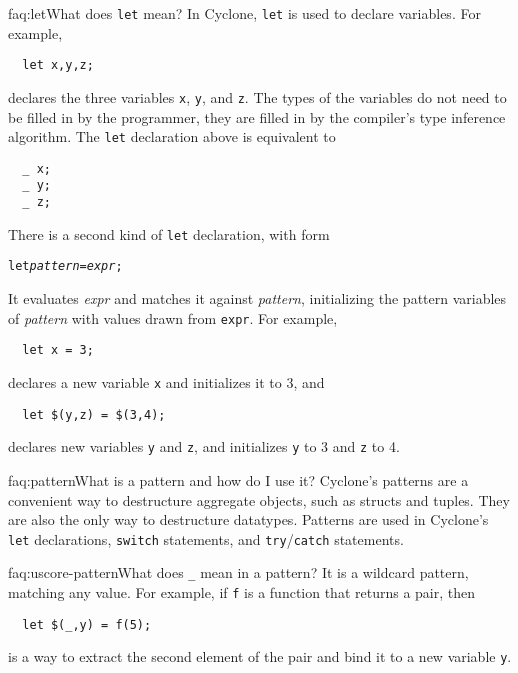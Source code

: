 \begin{faqa}{faq:let}{What does \texttt{let} mean?}
In Cyclone, \texttt{let} is used to declare variables.  For example,
\begin{verbatim}
  let x,y,z;
\end{verbatim}
declares the three variables \texttt{x}, \texttt{y}, and \texttt{z}.
The types of the variables do not need to be filled in by the
programmer, they are filled in by the compiler's type inference
algorithm.  The \texttt{let} declaration above is equivalent to
\begin{verbatim}
  _ x;
  _ y;
  _ z;
\end{verbatim}

There is a second kind of \texttt{let} declaration, with form
\begin{alltt}
  let {\it pattern} = {\it expr};
\end{alltt}
It evaluates \textit{expr} and matches it against \textit{pattern},
initializing the pattern variables of \textit{pattern} with values
drawn from \texttt{expr}.  For example,
\begin{verbatim}
  let x = 3;
\end{verbatim}
declares a new variable \texttt{x} and initializes it to 3, and
\begin{verbatim}
  let $(y,z) = $(3,4);
\end{verbatim}
declares new variables \texttt{y} and \texttt{z}, and initializes
\texttt{y} to 3 and \texttt{z} to 4.
\end{faqa}

\begin{faqa}{faq:pattern}{What is a pattern and how do I use it?}
Cyclone's patterns are a convenient way to destructure aggregate
objects, such as structs and tuples.  They are also the only way to
destructure datatypes.  Patterns are used in Cyclone's \texttt{let}
declarations, \texttt{switch} statements, and
\texttt{try}/\texttt{catch} statements.
\end{faqa}

\begin{faqa}{faq:uscore-pattern}{What does \texttt{_} mean in a pattern?}
It is a wildcard pattern, matching any value.  For example, if
\texttt{f} is a function that returns a pair, then
\begin{verbatim}
  let $(_,y) = f(5); 
\end{verbatim} %
is a way to extract the second element of the pair and bind it to a
new variable \texttt{y}.
\end{faqa}

